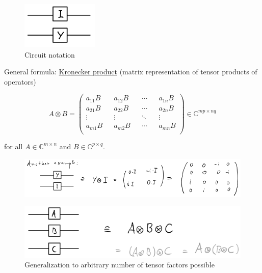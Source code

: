\begin{figure}[H]
    \centering
    \includegraphics[scale=0.5]{chapters/res/parallel-circuit-i-y.png}
    \caption{Circuit notation}
\end{figure}

General formula: \underline{Kronecker product} (matrix representation of tensor products of operators)

\begin{equation}
    A \otimes B = \begin{pmatrix*}
        a_{11} B && a_{12} B && \cdots && a_{1n} B \\
        a_{21} B && a_{22} B && \cdots && a_{2n} B \\
        \vdots && \vdots && \ddots && \vdots \\
        a_{m1} B && a_{m2} B && \cdots && a_{mn} B \\
    \end{pmatrix*} \in
    \mathbb{C}^{mp \times nq} 
\end{equation}

for all $ A \in \mathbb{C}^{m \times n}$ and $B \in \mathbb{C}^{p \times q}$.

\begin{figure}[H]
    \centering
    \includegraphics[scale=0.48]{chapters/res/kronecker-another-example.png}
\end{figure}

\begin{figure}[H]
    \centering
    \includegraphics[scale=0.48]{chapters/res/kronecker-generlization-3-tensors.png}
    \caption{Generalization to arbitrary number of tensor factors possible}
\end{figure}

